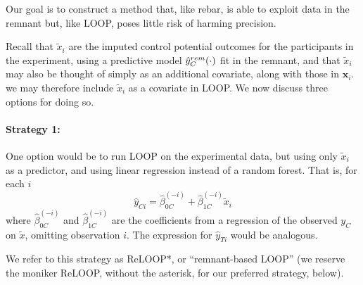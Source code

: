 
Our goal is to construct a method that, like rebar, is able to exploit data in the remnant but, like LOOP, poses little risk of harming precision.

Recall that
$\tilde{x}_{i}$ are the imputed control potential outcomes for the
participants in the experiment, using a predictive model
$\hat{y}_C^{rem}(\cdot)$ fit in the remnant, and that
$\tilde{x}_{i}$ may also be thought of simply as an additional
covariate, along with those in $\mathbf{x}_i$.
we may therefore include $\tilde{x}_{i}$ as a covariate in LOOP.  We now discuss
three options for doing so.



\paragraph{Strategy 1:}
One option would be to run LOOP on the experimental data, but using only $\tilde{x}_{i}$ as a predictor, and using linear regression instead of a random forest.  That is, for each $i$
\begin{equation}
\hat{y}_{Ci} = \hat{\beta}_{0C}^{(-i)} + \hat{\beta}_{1C}^{(-i)}\tilde{x}_{i}
\end{equation}
where  $\hat{\beta}_{0C}^{(-i)}$ and $\hat{\beta}_{1C}^{(-i)}$ are the
coefficients from a regression of the observed $y_C$ on $\tilde{x}$,
omitting observation $i$.  The expression for $\hat{y}_{Ti}$ would be
analogous.

We refer to this strategy as ReLOOP*, or ``remnant-based LOOP'' (we
reserve the moniker ReLOOP, without the asterisk, for our preferred
strategy, below).

